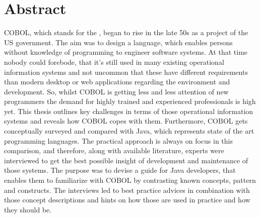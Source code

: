 \chapter*{Abstract} 

COBOL, which stands for the , began to rise in the late 50s as a project of the US government. The aim was to design a language, which enables persons without knowledge of programming to engineer software systems. At that time nobody could forebode, that it's still used in many existing operational information systems and not uncommon that these have different requirements than modern desktop or web applications regarding the environment and development. So, whilst COBOL is getting less and less attention of new programmers the demand for highly trained and experienced professionals is high yet. This thesis outlines key challenges in terms of those operational information systems and reveals how COBOL copes with them. Furthermore, COBOL gets conceptually surveyed and compared with Java, which represents state of the art programming languages. The practical approach is always on focus in this comparison, and therefore, along with available literature, experts were interviewed to get the best possible insight of development and maintenance of those systems. The purpose was to devise a guide for Java developers, that enables them to familiarize with COBOL by contrasting known concepts, pattern and constructs. The interviews led to best practice advices in combination with those concept descriptions and hints on how those are used in practice and how they should be.